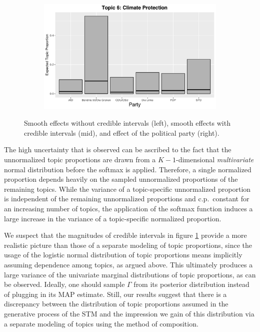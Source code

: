 \begin{figure}[h!]
\begin{subfigure}[b]{0.3\linewidth}
    \includegraphics[width=\linewidth]{../plots/5_1/direct_t6_cat.pdf}
  \end{subfigure}
  \caption{Smooth effects without credible intervals (left), smooth effects with credible intervals (mid), and effect of the political party (right).}
  \label{fig:directassessment}
\end{figure}

The high uncertainty that is observed can be ascribed to the fact that the unnormalized topic proportions are drawn from a $K-1$-dimensional \textit{multivariate} normal distribution before the softmax is applied. Therefore, a single normalized proportion depends heavily on the sampled unnormalized proportions of the remaining topics. While the variance of a topic-specific unnormalized proportion is independent of the remaining unnormalized proportions and c.p.\ constant for an increasing number of topics, the application of the softmax function induces a large increase in the variance of a topic-specific normalized proportion.

We suspect that the magnitudes of credible intervals in figure \ref{fig:directassessment} provide a more realistic picture than those of a separate modeling of topic proportions, since the usage of the logistic normal distribution of topic proportions means implicitly assuming dependence among topics, as argued above. This ultimately produces a large variance of the univariate marginal distributions of topic proportions, as can be observed. Ideally, one should sample $\Gamma$ from its posterior distribution instead of plugging in its MAP estimate. Still, our results suggest that there is a discrepancy between the distribution of topic proportions assumed in the generative process of the STM and the impression we gain of this distribution via a separate modeling of topics using the method of composition.

